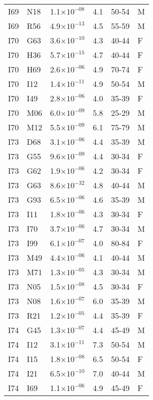 \begin{longtable}{lllrll}
   I69 & N18 & 1.1$\times10^{-08}$ & 4.1 & 50-54 & M \\ 
   I69 & R56 & 4.9$\times10^{-13}$ & 4.5 & 55-59 & M \\ 
   I70 & G63 & 3.6$\times10^{-10}$ & 4.3 & 40-44 & F \\ 
   I70 & H36 & 5.7$\times10^{-15}$ & 4.7 & 40-44 & F \\ 
   I70 & H69 & 2.6$\times10^{-06}$ & 4.9 & 70-74 & F \\ 
   I70 & I12 & 1.4$\times10^{-11}$ & 4.9 & 50-54 & M \\ 
   I70 & I49 & 2.8$\times10^{-06}$ & 4.0 & 35-39 & F \\ 
   I70 & M06 & 6.0$\times10^{-09}$ & 5.8 & 25-29 & M \\ 
   I70 & M12 & 5.5$\times10^{-09}$ & 6.1 & 75-79 & M \\ 
   I73 & D68 & 3.1$\times10^{-06}$ & 4.4 & 35-39 & M \\ 
   I73 & G55 & 9.6$\times10^{-09}$ & 4.4 & 30-34 & F \\ 
   I73 & G62 & 1.9$\times10^{-06}$ & 4.2 & 30-34 & F \\ 
   I73 & G63 & 8.6$\times10^{-32}$ & 4.8 & 40-44 & M \\ 
   I73 & G93 & 6.5$\times10^{-06}$ & 4.6 & 35-39 & M \\ 
   I73 & I11 & 1.8$\times10^{-06}$ & 4.3 & 30-34 & F \\ 
   I73 & I70 & 3.7$\times10^{-06}$ & 4.7 & 30-34 & M \\ 
   I73 & I99 & 6.1$\times10^{-07}$ & 4.0 & 80-84 & F \\ 
   I73 & M49 & 4.4$\times10^{-06}$ & 4.1 & 40-44 & M \\ 
   I73 & M71 & 1.3$\times10^{-05}$ & 4.3 & 30-34 & M \\ 
   I73 & N05 & 1.5$\times10^{-08}$ & 4.5 & 30-34 & F \\ 
   I73 & N08 & 1.6$\times10^{-07}$ & 6.0 & 35-39 & M \\ 
   I73 & R21 & 1.2$\times10^{-05}$ & 4.4 & 35-39 & F \\ 
   I74 & G45 & 1.3$\times10^{-07}$ & 4.4 & 45-49 & M \\ 
   I74 & I12 & 3.1$\times10^{-11}$ & 7.3 & 50-54 & M \\ 
   I74 & I15 & 1.8$\times10^{-08}$ & 6.5 & 50-54 & F \\ 
   I74 & I21 & 6.5$\times10^{-10}$ & 7.0 & 40-44 & M \\ 
   I74 & I69 & 1.1$\times10^{-06}$ & 4.9 & 45-49 & F \\ 

\end{longtable}
